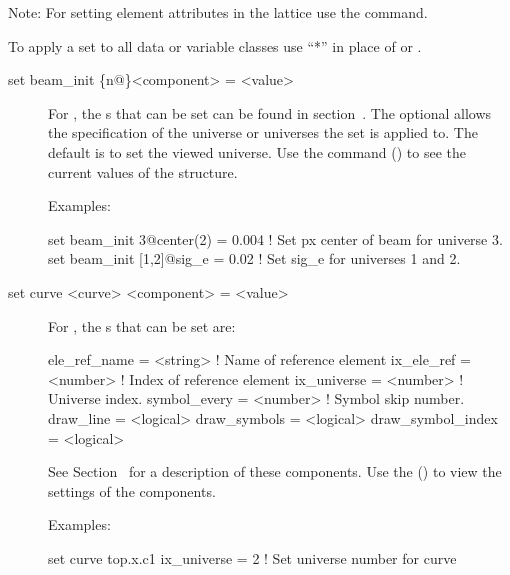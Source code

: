 {{\vskip 0.2in 
Note: For setting element attributes in the 
lattice use the  command.

To apply a set to all data or variable classes use ``*''
in place of  or .



\begin{description}

\item[set beam\_init \{n@\}<component> = <value>] \Newline
For , the s that can be set can be
found in section~. The optional  allows the
specification of the universe or universes the set is applied to. The
default is to set the viewed universe. Use the  command
() to see the current values of the 
structure.

Examples:
\begin{example}
  set beam_init 3@center(2) = 0.004  ! Set px center of beam for universe 3.
  set beam_init [1,2]@sig_e = 0.02   ! Set sig_e for universes 1 and 2.
\end{example}



\item[set curve <curve> <component> = <value>] \Newline
For , the s that can be set are:
\begin{example}
  ele_ref_name      = <string>  ! Name of reference element
  ix_ele_ref        = <number>  ! Index of reference element
  ix_universe       = <number>  ! Universe index.
  symbol_every      = <number>  ! Symbol skip number.
  draw_line         = <logical> 
  draw_symbols      = <logical> 
  draw_symbol_index = <logical> 
\end{example}
See Section~ for a description of these components.
Use the  () to view the settings of the
components.

Examples:
\begin{example}
  set curve top.x.c1 ix_universe = 2  ! Set universe number for curve
\end{example}


\end{description}}}
